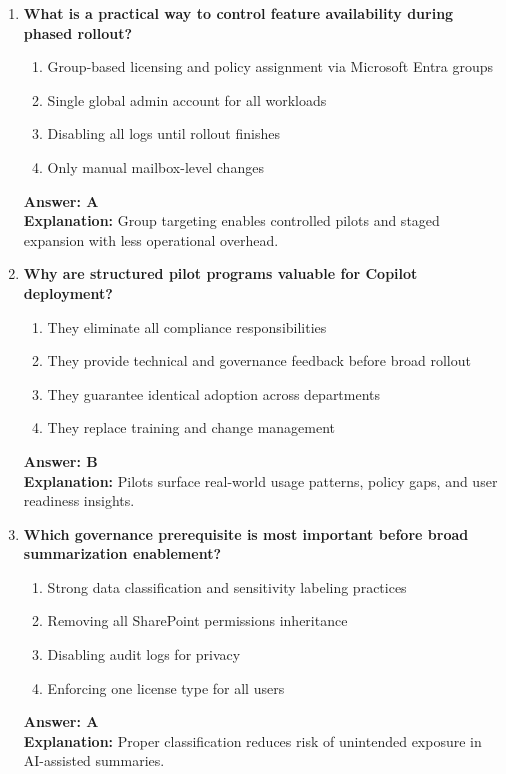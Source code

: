 \documentclass[10pt]{article}
\begin{document}
\begin{enumerate}[leftmargin=*]
\item \textbf{What is a practical way to control feature availability during phased rollout?}
\begin{enumerate}[label=\Alph*.]
  \item Group-based licensing and policy assignment via Microsoft Entra groups
  \item Single global admin account for all workloads
  \item Disabling all logs until rollout finishes
  \item Only manual mailbox-level changes
\end{enumerate}
\textbf{Answer: A}\\
\textbf{Explanation:} Group targeting enables controlled pilots and staged expansion with less operational overhead.

\item \textbf{Why are structured pilot programs valuable for Copilot deployment?}
\begin{enumerate}[label=\Alph*.]
  \item They eliminate all compliance responsibilities
  \item They provide technical and governance feedback before broad rollout
  \item They guarantee identical adoption across departments
  \item They replace training and change management
\end{enumerate}
\textbf{Answer: B}\\
\textbf{Explanation:} Pilots surface real-world usage patterns, policy gaps, and user readiness insights.

\item \textbf{Which governance prerequisite is most important before broad summarization enablement?}
\begin{enumerate}[label=\Alph*.]
  \item Strong data classification and sensitivity labeling practices
  \item Removing all SharePoint permissions inheritance
  \item Disabling audit logs for privacy
  \item Enforcing one license type for all users
\end{enumerate}
\textbf{Answer: A}\\
\textbf{Explanation:} Proper classification reduces risk of unintended exposure in AI-assisted summaries.


\end{enumerate}
\end{document}
